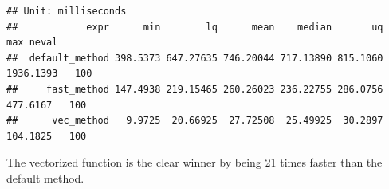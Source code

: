 \documentclass[
]{article}
\begin{document}
\begin{verbatim}
## Unit: milliseconds
##            expr      min        lq      mean    median       uq       max neval
##  default_method 398.5373 647.27635 746.20044 717.13890 815.1060 1936.1393   100
##     fast_method 147.4938 219.15465 260.26023 236.22755 286.0756  477.6167   100
##      vec_method   9.9725  20.66925  27.72508  25.49925  30.2897  104.1825   100
\end{verbatim}

The vectorized function is the clear winner by being 21 times faster
than the default method.
\end{document}

